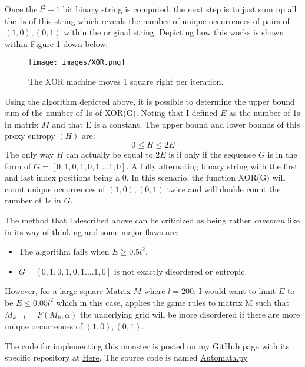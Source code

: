 \vspace{0.3cm}
Once the $l^2-1$ bit binary string is computed, the next step is to just sum up all the 1s of this string which reveals the number of unique occurrences of pairs of $(1,0), (0,1)$ within the original string. Depicting how this works is shown within Figure \ref{fig:XOR} down below: 
\begin{figure}[H]
    \centering
    \texttt{[image: images/XOR.png]}
    \caption{The XOR machine moves 1 square right per iteration.}
    \label{fig:XOR}
\end{figure}
Using the algorithm depicted above, it is possible to determine the upper bound sum of the number of 1s of XOR(G). Noting that I defined $E$ as the number of 1s in matrix $M$ and that E is a constant. The upper bound and lower bounds of this proxy entropy $(H)$ are: 
$$0 \le H \le 2E$$
The only way $H$ can actually be equal to $2E$ is if only if the sequence $G$ is in the form of $G=[0, 1, 0, 1, 0, 1 .... 1, 0]$. A fully alternating binary string with the first and last index positions being a 0. In this scenario, the function XOR(G) will count unique occurrences of $(1,0), (0,1)$ twice and will double count the number of 1s in $G$. \par

\vspace{0.3cm}
The method that I described above can be criticized as being rather \emph{caveman} like in its way of thinking and some major flaws are: 
\begin{itemize}
    \item The algorithm fails when $E \ge 0.5 l^{2}$.
    \item $G=[0, 1, 0, 1, 0, 1 .... 1, 0]$ is not exactly disordered or entropic.
\end{itemize}
However, for a large square Matrix $M$ where $l=200$. I would want to limit $E$ to be $E \leq 0.05l^{2}$ which in this case, applies the game rules to matrix M such that $M_{k+1}=F(M_{k}, \alpha)$ the underlying grid will be more disordered if there are more unique occurrences of $(1,0), (0,1)$. \par

\vspace{0.3cm}
The code for implementing this monster is posted on my GitHub page with its specific repository at \href{https://github.com/ShiroHusin/Entropy_Simulation?fbclid=IwAR32gsNSPyy80Pt0_VytukZG9eIPFMg20cl77TeuiW-TH2A0giijnKegKTo}{Here}. The source code is named \href{https://github.com/ShiroHusin/Entropy_Simulation/blob/main/Automata.py}{Automata.py}
